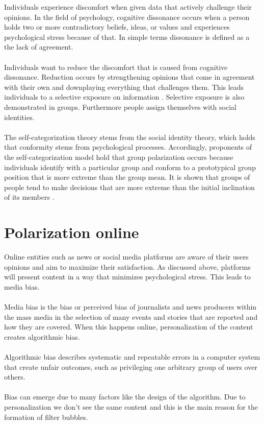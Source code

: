 Individuals experience discomfort when given data that actively challenge their opinions. In the field of psychology, cognitive dissonance occurs when a person holds two or more contradictory beliefs, ideas, or values and experiences psychological stress because of that. In simple terms dissonance is defined as a the lack of agreement.
\\
\\
Individuals want to reduce the discomfort that is caused from cognitive dissonance. Reduction occurs by strengthening opinions that come in agreement with their own and downplaying everything that challenges them. This leads individuals to a selective exposure on information \cite{jonasHardtFreyThelen2001}. Selective exposure is also demonstrated in groups. Furthermore people assign themselves with social identities. 
\\
\\
The self-categorization theory stems from the social identity theory, which holds that conformity stems from psychological processes. Accordingly, proponents of the self-categorization model hold that group polarization occurs because individuals identify with a particular group and conform to a prototypical group position that is more extreme than the group mean. It is shown that groups of people tend to make decisions that are more extreme than the initial inclination of its members \cite{sunstein}.

\label{sec:Structure}

\section{Polarization online}

Online entities such as news or social media platforms are aware of their users opinions  and aim to maximize their satisfaction. As discussed above, platforms will present content in a way that minimizes psychological stress. This leads to media bias. 
\\
\\
Media bias is the bias or perceived bias of journalists and news producers within the mass media in the selection of many events and stories that are reported and how they are covered. When this happens online, personalization of the content creates algorithmic bias. 
\\
\\
Algorithmic bias describes systematic and repeatable errors in a computer system that create unfair outcomes, such as privileging one arbitrary group of users over others. 
\\
\\
Bias can emerge due to many factors like the design of the algorithm. Due to personalization we don't see the same content and this is the main reason for the formation of filter bubbles.


